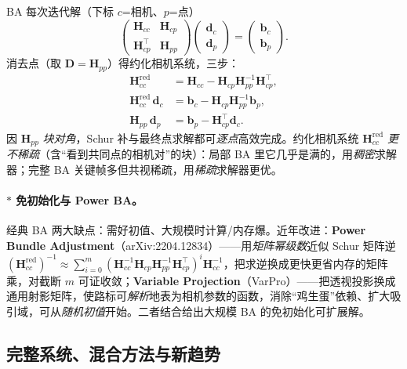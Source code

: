 \begin{derivation}
\label{thm:vo-schur-ba}
BA 每次迭代解（下标 $c$=相机、$p$=点）\cite{carlone2026handbook}
\[
  \begin{pmatrix}\mathbf{H}_{cc}&\mathbf{H}_{cp}\\\mathbf{H}_{cp}^\top&\mathbf{H}_{pp}\end{pmatrix}\begin{pmatrix}\mathbf{d}_c\\\mathbf{d}_p\end{pmatrix}=\begin{pmatrix}\mathbf{b}_c\\\mathbf{b}_p\end{pmatrix}.
\]
消去点（取 $\mathbf{D}=\mathbf{H}_{pp}$）得约化相机系统，三步：
\begin{align}
  \mathbf{H}_{cc}^{\text{red}}&=\mathbf{H}_{cc}-\mathbf{H}_{cp}\mathbf{H}_{pp}^{-1}\mathbf{H}_{cp}^\top,\label{eq:vo-schur-a}\\
  \mathbf{H}_{cc}^{\text{red}}\,\mathbf{d}_c&=\mathbf{b}_c-\mathbf{H}_{cp}\mathbf{H}_{pp}^{-1}\mathbf{b}_p,\label{eq:vo-schur-b}\\
  \mathbf{H}_{pp}\,\mathbf{d}_p&=\mathbf{b}_p-\mathbf{H}_{cp}^\top\mathbf{d}_c.\label{eq:vo-schur-c}
\end{align}
因 $\mathbf{H}_{pp}$ \emph{块对角}，Schur 补与最终点求解都可\emph{逐点}高效完成。约化相机系统 $\mathbf{H}_{cc}^{\text{red}}$ \emph{更不稀疏}（含“看到共同点的相机对”的块）：局部 BA 里它几乎是满的，用\emph{稠密}求解器；完整 BA 关键帧多但共视稀疏，用\emph{稀疏}求解器更优。
\end{derivation}

\paragraph{$*$ 免初始化与 Power BA\cite{carlone2026handbook}。}经典 BA 两大缺点：需好初值、大规模时计算/内存爆。近年改进：\textbf{Power Bundle Adjustment}（arXiv:2204.12834）——用\emph{矩阵幂级数}近似 Schur 矩阵逆 $(\mathbf{H}_{cc}^{\text{red}})^{-1}\approx\sum_{i=0}^{m}(\mathbf{H}_{cc}^{-1}\mathbf{H}_{cp}\mathbf{H}_{pp}^{-1}\mathbf{H}_{cp}^\top)^i\mathbf{H}_{cc}^{-1}$，把求逆换成更快更省内存的矩阵乘，对截断 $m$ 可证收敛；\textbf{Variable Projection}（VarPro）——把透视投影换成通用射影矩阵，使路标可\emph{解析}地表为相机参数的函数，消除“鸡生蛋”依赖、扩大吸引域，可从\emph{随机初值}开始。二者结合给出大规模 BA 的免初始化可扩展解。

\subsection{完整系统、混合方法与新趋势}
\label{sec:vo-systems}


